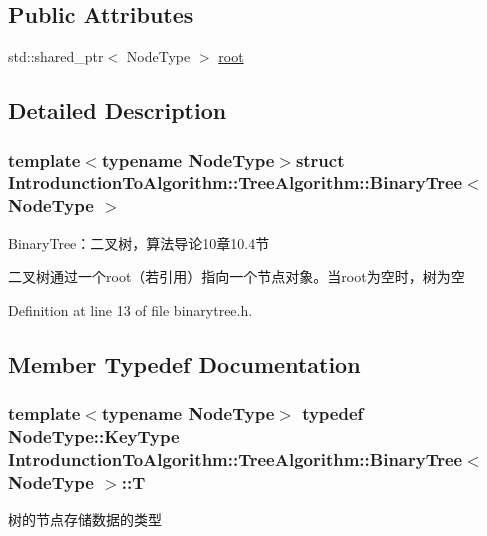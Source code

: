 \subsection*{Public Attributes}
\begin{DoxyCompactItemize}
\item 
std\+::shared\+\_\+ptr$<$ Node\+Type $>$ \hyperlink{struct_introdunction_to_algorithm_1_1_tree_algorithm_1_1_binary_tree_acd08e406313d41bb0dd2e17aabde8482}{root}
\end{DoxyCompactItemize}


\subsection{Detailed Description}
\subsubsection*{template$<$typename Node\+Type$>$struct Introdunction\+To\+Algorithm\+::\+Tree\+Algorithm\+::\+Binary\+Tree$<$ Node\+Type $>$}

Binary\+Tree：二叉树，算法导论10章10.4节 

二叉树通过一个root（若引用）指向一个节点对象。当root为空时，树为空 

Definition at line 13 of file binarytree.\+h.



\subsection{Member Typedef Documentation}
\hypertarget{struct_introdunction_to_algorithm_1_1_tree_algorithm_1_1_binary_tree_ae2feaade7bbb1e1f436475069cb1cd20}{}
\subsubsection[{T}]{\setlength{\rightskip}{0pt plus 5cm}template$<$typename Node\+Type$>$ typedef Node\+Type\+::\+Key\+Type {\bf Introdunction\+To\+Algorithm\+::\+Tree\+Algorithm\+::\+Binary\+Tree}$<$ Node\+Type $>$\+::{\bf T}}\label{struct_introdunction_to_algorithm_1_1_tree_algorithm_1_1_binary_tree_ae2feaade7bbb1e1f436475069cb1cd20}
树的节点存储数据的类型 

